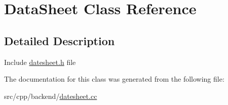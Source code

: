 \hypertarget{classDataSheet}{\section{Data\-Sheet Class Reference}
\label{classDataSheet}
}


\subsection{Detailed Description}
Include \hyperlink{datesheet_8h}{datesheet.\-h} file 

The documentation for this class was generated from the following file\-:\begin{DoxyCompactItemize}
\item 
src/cpp/backend/\hyperlink{datesheet_8cc}{datesheet.\-cc}\end{DoxyCompactItemize}

